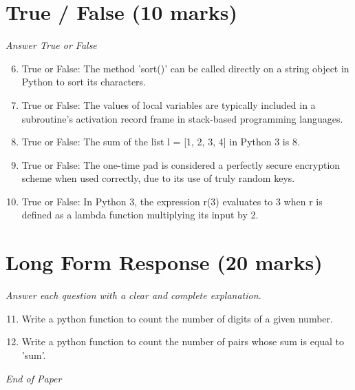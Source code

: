 \documentclass[12pt]{article}
\begin{document}
\section*{True / False (10 marks)}
\textit{Answer True or False}
\begin{enumerate}[label=\arabic*.]
\setcounter{enumi}{5}
\item True or False: The method 'sort()' can be called directly on a string object in Python to sort its characters.
\item True or False: The values of local variables are typically included in a subroutine's activation record frame in stack-based programming languages.
\item True or False: The sum of the list l = [1, 2, 3, 4] in Python 3 is 8.
\item True or False: The one-time pad is considered a perfectly secure encryption scheme when used correctly, due to its use of truly random keys.
\item True or False: In Python 3, the expression r(3) evaluates to 3 when r is defined as a lambda function multiplying its input by 2.
\end{enumerate}

\section*{Long Form Response (20 marks)}
\textit{Answer each question with a clear and complete explanation.}
\begin{enumerate}[label=\arabic*.]
\setcounter{enumi}{10}
\item Write a python function to count the number of digits of a given number.
\item Write a python function to count the number of pairs whose sum is equal to 'sum'.
\end{enumerate}

\vfill
\noindent\textit{End of Paper}
\end{document}
